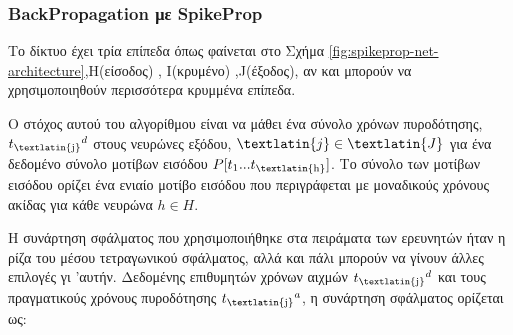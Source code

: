 \documentclass[12pt]{report}
\begin{document}
\subsubsection{\textlatin{BackPropagation} με \textlatin{SpikeProp}}

Το δίκτυο έχει τρία επίπεδα όπως φαίνεται στο Σχήμα \ref{fig:spikeprop-net-architecture},\textlatin{H}(είσοδος) , \textlatin{I}(κρυμένο) ,\textlatin{J}(έξοδος), αν και μπορούν να χρησιμοποιηθούν περισσότερα κρυμμένα επίπεδα.

Ο στόχος αυτού του αλγορίθμου είναι να μάθει ένα σύνολο χρόνων πυροδότησης,{\(t\textsubscript{\textlatin{j}}^d\)} στους νευρώνες εξόδου, {\(\textlatin{j}\in \textlatin{J}\)} για ένα δεδομένο σύνολο μοτίβων εισόδου {\(P[t\textsubscript{1}...t\textsubscript{\textlatin{h}}]\)}. Το σύνολο των μοτίβων εισόδου ορίζει ένα ενιαίο μοτίβο εισόδου που περιγράφεται με μοναδικούς χρόνους ακίδας για κάθε νευρώνα {\(h\in H\)}.

Η συνάρτηση σφάλματος που χρησιμοποιήθηκε στα πειράματα των ερευνητών ήταν η ρίζα του μέσου τετραγωνικού σφάλματος, αλλά και πάλι μπορούν να γίνουν άλλες επιλογές γι 'αυτήν. Δεδομένης επιθυμητών χρόνων αιχμών
{\(t\textsubscript{\textlatin{j}}^d\)} και τους πραγματικούς χρόνους πυροδότησης {\(t\textsubscript{\textlatin{j}}^a\)}, η συνάρτηση σφάλματος ορίζεται ως:
\end{document}
